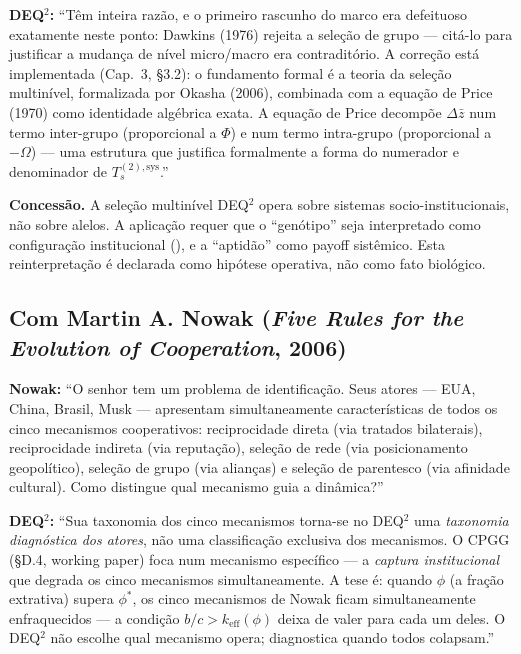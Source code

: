 \textbf{DEQ$^2$:} ``T\^{e}m inteira raz\~{a}o, e o primeiro rascunho do
marco era defeituoso exatamente neste ponto: Dawkins (1976) rejeita a
sele\c{c}\~{a}o de grupo --- cit\'{a}-lo para justificar a mudan\c{c}a de
n\'{i}vel micro/macro era contradit\'{o}rio. A corre\c{c}\~{a}o est\'{a}
implementada (Cap.~3, §3.2): o fundamento formal \'{e} a teoria da
sele\c{c}\~{a}o multinível, formalizada por Okasha (2006), combinada com
a equa\c{c}\~{a}o de Price (1970) como identidade alg\'{e}brica exata. A
equa\c{c}\~{a}o de Price decompõe $\Delta\bar{z}$ num termo inter-grupo
(proporcional a $\Phi$) e num termo intra-grupo (proporcional a $-\Omega$)
--- uma estrutura que justifica formalmente a forma do numerador e
denominador de $T_s^{(2),\text{sys}}$.''

\textbf{Concess\~{a}o.} A sele\c{c}\~{a}o multinível DEQ$^2$ opera sobre
sistemas socio-institucionais, n\~{a}o sobre alelos. A aplica\c{c}\~{a}o
requer que o ``gen\'{o}tipo'' seja interpretado como configura\c{c}\~{a}o
institucional (\Hypoth{}), e a ``aptid\~{a}o'' como payoff sist\^{e}mico.
Esta reinterpreta\c{c}\~{a}o \'{e} declarada como hip\'{o}tese operativa,
n\~{a}o como fato biol\'{o}gico.

\subsection{Com Martin A. Nowak (\emph{Five Rules for the Evolution of
Cooperation}, 2006)}\label{con-nowak-2006}

\textbf{Nowak:} ``O senhor tem um problema de identifica\c{c}\~{a}o. Seus
atores --- EUA, China, Brasil, Musk --- apresentam simultaneamente
caracter\'{i}sticas de todos os cinco mecanismos cooperativos:
reciprocidade direta (via tratados bilaterais), reciprocidade indireta
(via reputa\c{c}\~{a}o), sele\c{c}\~{a}o de rede (via posicionamento
geopol\'{i}tico), sele\c{c}\~{a}o de grupo (via alian\c{c}as) e
sele\c{c}\~{a}o de parentesco (via afinidade cultural). Como distingue
qual mecanismo guia a din\^{a}mica?''

\textbf{DEQ$^2$:} ``Sua taxonomia dos cinco mecanismos torna-se no
DEQ$^2$ uma \emph{taxonomia diagn\'{o}stica dos atores}, n\~{a}o uma
classifica\c{c}\~{a}o exclusiva dos mecanismos. O CPGG (§D.4, working
paper) foca num mecanismo espec\'{i}fico --- a \emph{captura institucional}
que degrada os cinco mecanismos simultaneamente. A tese \'{e}: quando
$\phi$ (a fra\c{c}\~{a}o extrativa) supera $\phi^*$, os cinco mecanismos
de Nowak ficam simultaneamente enfraquecidos --- a condi\c{c}\~{a}o
$b/c > k_{\text{eff}}(\phi)$ deixa de valer para cada um deles. O DEQ$^2$
n\~{a}o escolhe qual mecanismo opera; diagnostica quando todos
colapsam.''

